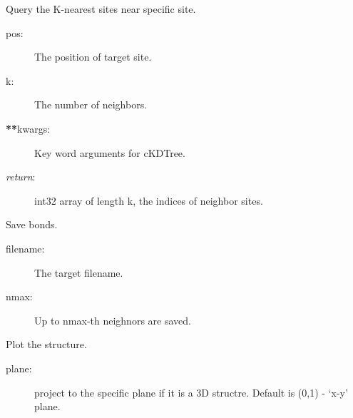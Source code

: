 \documentclass[letterpaper,10pt,oneside,openany]{sphinxmanual}
\begin{document}
\begin{fulllineitems}

\begin{fulllineitems}
\label{index:lattice.structure.Structure.query}
Query the K-nearest sites near specific site.
\begin{description}
\item[{pos:}] \leavevmode
The position of target site.

\item[{k:}] \leavevmode
The number of neighbors.

\item[{{\color{red}\bfseries{}**}kwargs:}] \leavevmode
Key word arguments for cKDTree.

\item[{\emph{return}:}] \leavevmode
int32 array of length k, the indices of neighbor sites.

\end{description}

\end{fulllineitems}


\begin{fulllineitems}
\label{index:lattice.structure.Structure.save_bonds}
Save bonds.
\begin{description}
\item[{filename:}] \leavevmode
The target filename.

\item[{nmax:}] \leavevmode
Up to nmax-th neighnors are saved.

\end{description}

\end{fulllineitems}


\begin{fulllineitems}
\label{index:lattice.structure.Structure.show_bonds}
Plot the structure.
\begin{description}
\item[{plane:}] \leavevmode
project to the specific plane if it is a 3D structre.
Default is (0,1) - `x-y' plane.


\end{description}
\end{fulllineitems}
\end{fulllineitems}
\end{document}

